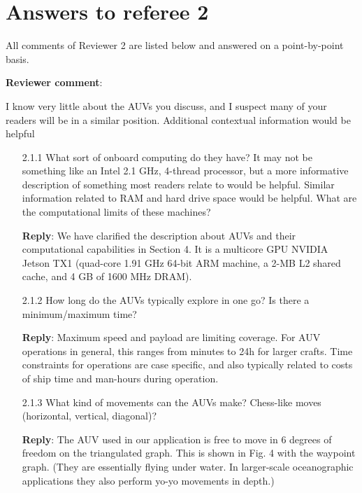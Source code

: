 \documentclass[a4paper]{article}
\newcounter{reviewer}
\def\revcom{\textbf{Reviewer comment}}
\def\reply{\textbf{Reply}}
\begin{document}
\section*{Answers to referee 2}
All comments of Reviewer 2 are listed below and answered on a point-by-point basis.

\setcounter{reviewer}{2}

\begin{answers}
\item{\revcom : }\label{r2c1}

I know very little about the AUVs you discuss, and I suspect many of your readers will be in a similar position. Additional contextual information would be helpful

\begin{itemize}[noitemsep,topsep=0pt,parsep=0pt,partopsep=0pt]

\item[2.1.1] What sort of onboard computing do they have? It may not be something like an Intel 2.1 GHz, 4-thread processor, but a more informative description of something most readers relate to would be helpful. Similar information related to RAM and hard drive space would be helpful. What are the computational limits of these machines?\par

\reply: We have clarified the description about AUVs and their computational capabilities in Section 4. 
It is a multicore GPU NVIDIA Jetson TX1 (quad-core 1.91 GHz 64-bit ARM machine, a 2-MB L2 shared cache, and 4 GB of 1600 MHz DRAM). 
\vspace{1em}

\item[2.1.2] How long do the AUVs typically explore in one go? Is there a minimum/maximum time?\par 

\reply: Maximum speed and payload are limiting coverage. For AUV operations in general, this ranges from minutes to 24h for larger crafts. Time constraints for operations are case specific, and also typically related to costs of ship time and man-hours during operation.  
\vspace{1em}

\item[2.1.3] What kind of movements can the AUVs make? Chess-like moves (horizontal, vertical, diagonal)?\par  

\reply: The AUV used in our application is free to move in 6 degrees of freedom on the triangulated graph. This is shown in Fig. 4 with the waypoint graph. (They are essentially flying under water. In larger-scale oceanographic applications they also perform yo-yo movements in depth.) 
\vspace{1em}


\end{itemize}
\end{answers}
\end{document}
